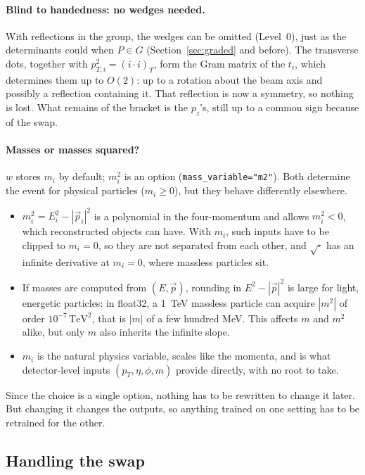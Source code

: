 \documentclass[11pt]{article}
\theoremstyle{definition}
\theoremstyle{remark}
\begin{document}
\paragraph{Blind to handedness: no wedges needed.}
With reflections in the group, the wedges can be omitted (Level~0), just as the
determinants could when $P \in G$ (Section~\ref{sec:graded} and before). The
transverse dots, together with $p_{T,i}^2 = (i\cdot i)_T$, form the Gram matrix
of the $t_i$, which determines them up to $O(2)$: up to a rotation about the
beam axis and possibly a reflection containing it. That reflection is now a
symmetry, so nothing is lost. What remains of the bracket is the $p_z$'s, still
up to a common sign because of the swap.

\paragraph{Masses or masses squared?}
$w$ stores $m_i$ by default; $m_i^2$ is an option
(\texttt{mass\_variable="m2"}). Both determine the event for physical particles
($m_i \ge 0$), but they behave differently elsewhere.
\begin{itemize}
  \item $m_i^2 = E_i^2 - |\vec p_i|^2$ is a polynomial in the four-momentum and
    allows $m_i^2 < 0$, which reconstructed objects can have. With $m_i$, such
    inputs have to be clipped to $m_i = 0$, so they are not separated from each
    other, and $\sqrt{\cdot}$ has an infinite derivative at $m_i = 0$, where
    massless particles sit.
  \item If masses are computed from $(E, \vec p)$, rounding in $E^2 - |\vec p|^2$
    is large for light, energetic particles: in float32, a 1~TeV massless
    particle can acquire $|m^2|$ of order $10^{-7}\,\mathrm{TeV}^2$, that is
    $|m|$ of a few hundred MeV. This affects $m$ and $m^2$ alike, but only
    $m$ also inherits the infinite slope.
  \item $m_i$ is the natural physics variable, scales like the momenta, and is
    what detector-level inputs $(p_T, \eta, \phi, m)$ provide directly, with no
    root to take.
\end{itemize}
Since the choice is a single option, nothing has to be rewritten to change it
later. But changing it changes the outputs, so anything trained on one setting
has to be retrained for the other.

\subsection{Handling the swap}
\end{document}
